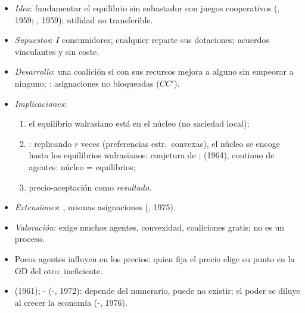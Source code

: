 \documentclass{article}
\begin{document}
\begin{columnas}
\begin{itemize}
\item \emph{Idea}: fundamentar el equilibrio sin subastador con juegos cooperativos (, 1959; , 1959); utilidad no transferible.
\item \emph{Supuestos}: $I$ consumidores; cualquier  reparte sus dotaciones; acuerdos vinculantes y sin coste.
\item \emph{Desarrollo}: una coalición  si con sus recursos mejora a alguno sin empeorar a ninguno; : asignaciones no bloqueadas ($CC'$).
\end{itemize}
\begin{itemize}
\item \emph{Implicaciones}:
  \begin{enumerate}
  \item el equilibrio walrasiano está en el núcleo (no saciedad local);
  \item {}: replicando $r$ veces (preferencias estr.\ convexas), el núcleo se encoge hasta los equilibrios walrasianos: conjetura de ;  (1964), continuo de agentes: núcleo = equilibrios;
  \item precio-aceptación como \emph{resultado}.
  \end{enumerate}
\item \emph{Extensiones}: , mismas asignaciones (, 1975).
\item \emph{Valoración}: exige muchos agentes, convexidad, coaliciones gratis; no es un proceso.
\end{itemize}
\begin{itemize}
\item Pocos agentes influyen en los precios: quien fija el precio elige su punto en la OD del otro: ineficiente.
\item {} (1961); - (-, 1972): depende del numerario, puede no existir; el poder se diluye al crecer la economía (-, 1976).
\end{itemize}

\end{columnas}
\end{document}
